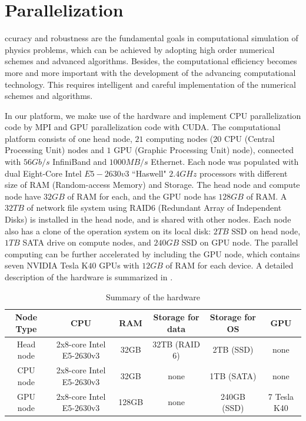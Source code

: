 \chapter{Parallelization}
ccuracy and robustness are the fundamental goals in computational
simulation of physics problems, which can be  achieved by adopting high
order numerical schemes and advanced algorithms.
Besides, the computational efficiency becomes more and more important with
the development of the advancing computational technology.
This requires intelligent and careful implementation of the numerical
schemes and algorithms.

In our \FronTierp platform, we make use of the hardware and implement CPU
parallelization code by MPI and GPU parallelization code with CUDA.
The computational platform consists of one head node, $21$ computing nodes
($20$ CPU (Central Processing Unit) nodes and $1$ GPU (Graphic Processing
Unit) node), connected with $56Gb/s$ InfiniBand and $1000MB/s$ Ethernet.
Each node was populated with dual Eight-Core Intel $E5-2630v3$ ``Haswell"
$2.4GHz$ processors with different size of RAM (Random-access Memory) and
Storage.
The head node and compute node have $32GB$ of RAM for each, and the GPU node
has $128GB$ of RAM. A $32TB$ of network file system using RAID6 (Redundant
Array of Independent Disks) is installed in the head node, and is shared with
other nodes.
Each node also has a clone of the operation system on its local disk: $2TB$
SSD on head node, $1TB$ SATA drive on compute nodes, and $240GB$ SSD on GPU
node.
The parallel computing can be further accelerated by including the GPU node,
which contains seven NVIDIA Tesla K$40$ GPUs with $12GB$ of RAM for each
device.
A detailed description of the hardware is summarized in .
\begin{table}
\centering
\small
\setlength\tabcolsep{2pt}
\begin{tabular}{|c|c|c|c|c|c|}
\hline
Node Type & CPU & RAM & Storage for data & Storage for OS & GPU\\
\hline
Head node & 2x8-core Intel E5-2630v3 & 32GB  & 32TB (RAID 6)  &  2TB (SSD) & none \\
CPU node & 2x8-core Intel E5-2630v3 & 32GB  & none  &  1TB (SATA) & none \\
GPU node & 2x8-core Intel E5-2630v3 & 128GB & none  &  240GB (SSD) & 7 Tesla K40 \\
\hline
\end{tabular}
\caption{Summary of the hardware}
\label{tab:hardware}
\end{table}

